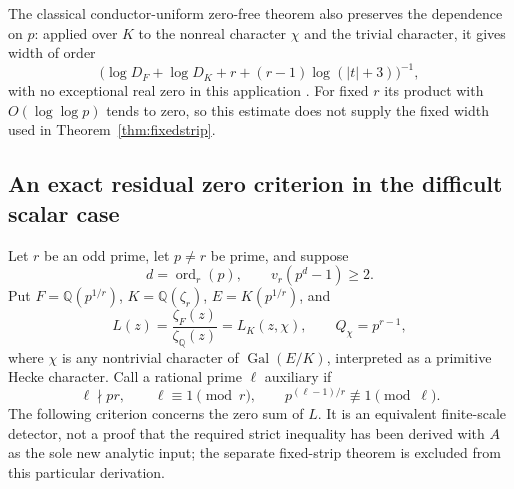 \documentclass[11pt]{article}
\theoremstyle{definition}
\theoremstyle{remark}
\begin{document}
The classical conductor-uniform zero-free theorem also preserves the dependence on $p$: applied over $K$ to the nonreal character $\chi$ and the trivial character, it gives width of order
\[
\bigl(\log D_F+\log D_K+r+(r-1)\log(|t|+3)\bigr)^{-1},
\]
with no exceptional real zero in this application
\citep[Appendix A, Theorem A.1, p.~12, and Remark A.4, p.~13]{HumphriesBrumley2019}.
For fixed $r$ its product with $O(\log\log p)$ tends to zero, so this estimate does not supply the fixed width used in Theorem~\ref{thm:fixedstrip}.

\subsection{An exact residual zero criterion in the difficult scalar case}
\label{sec:kummer-residual-zero}

Let $r$ be an odd prime, let $p\ne r$ be prime, and suppose
\[
 d=\operatorname{ord}_r(p),\qquad v_r(p^d-1)\geq2.
\]
Put $F=\mathbb Q(p^{1/r})$, $K=\mathbb Q(\zeta_r)$,
$E=K(p^{1/r})$, and
\[
 L(z)=\frac{\zeta_F(z)}{\zeta_{\mathbb Q}(z)}=L_K(z,\chi),
 \qquad Q_\chi=p^{r-1},
\]
where $\chi$ is any nontrivial character of
$\operatorname{Gal}(E/K)$, interpreted as a primitive Hecke character.
Call a rational prime $\ell$ auxiliary if
\[
 \ell\nmid pr,\qquad \ell\equiv1\pmod r,
 \qquad p^{(\ell-1)/r}\not\equiv1\pmod\ell.
\]
The following criterion concerns the zero sum of $L$.
It is an equivalent finite-scale detector, not a proof that the
required strict inequality has been derived with $A$ as the sole
new analytic input; the separate fixed-strip theorem is excluded from
this particular derivation.
\end{document}
